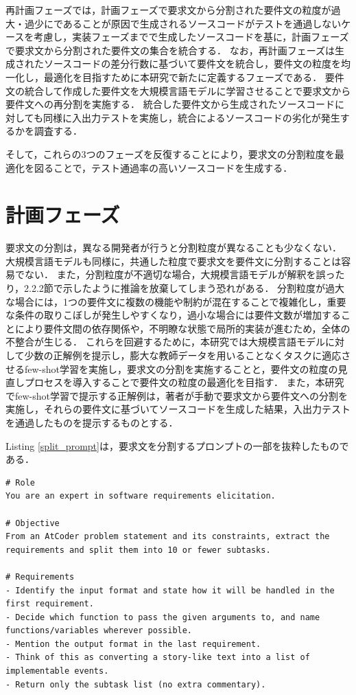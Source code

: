 \documentclass[11pt]{jreport}
\begin{document}
再計画フェーズでは，計画フェーズで要求文から分割された要件文の粒度が過大・過少にであることが原因で生成されるソースコードがテストを通過しないケースを考慮し，実装フェーズまでで生成したソースコードを基に，計画フェーズで要求文から分割された要件文の集合を統合する．
なお，再計画フェーズは生成されたソースコードの差分行数に基づいて要件文を統合し，要件文の粒度を均一化し，最適化を目指すために本研究で新たに定義するフェーズである．
要件文の統合して作成した要件文を大規模言語モデルに学習させることで要求文から要件文への再分割を実施する．
統合した要件文から生成されたソースコードに対しても同様に入出力テストを実施し，統合によるソースコードの劣化が発生するかを調査する．

そして，これらの3つのフェーズを反復することにより，要求文の分割粒度を最適化を図ることで，テスト通過率の高いソースコードを生成する．


\section{計画フェーズ}

要求文の分割は，異なる開発者が行うと分割粒度が異なることも少なくない\cite{Division_Size}．
大規模言語モデルも同様に，共通した粒度で要求文を要件文に分割することは容易でない．
また，分割粒度が不適切な場合，大規模言語モデルが解釈を誤ったり，2.2.2節で示したように推論を放棄してしまう恐れがある．
分割粒度が過大な場合には，1つの要件文に複数の機能や制約が混在することで複雑化し，重要な条件の取りこぼしが発生しやすくなり，過小な場合には要件文数が増加することにより要件文間の依存関係や，不明瞭な状態で局所的実装が進むため，全体の不整合が生じる．
これらを回避するために，本研究では大規模言語モデルに対して少数の正解例を提示し，膨大な教師データを用いることなくタスクに適応させるfew-shot学習を実施し，要求文の分割を実施することと，要件文の粒度の見直しプロセスを導入することで要件文の粒度の最適化を目指す．
また，本研究でfew-shot学習で提示する正解例は，著者が手動で要求文から要件文への分割を実施し，それらの要件文に基づいてソースコードを生成した結果，入出力テストを通過したものを提示するものとする．

Listing \ref{split_prompt}は，要求文を分割するプロンプトの一部を抜粋したものである．


\begin{lstlisting}[caption={要求文分割プロンプト（一部抜粋）},label={split_prompt}]
# Role
You are an expert in software requirements elicitation.

# Objective
From an AtCoder problem statement and its constraints, extract the requirements and split them into 10 or fewer subtasks.

# Requirements
- Identify the input format and state how it will be handled in the first requirement.
- Decide which function to pass the given arguments to, and name functions/variables wherever possible.
- Mention the output format in the last requirement.
- Think of this as converting a story-like text into a list of implementable events.
- Return only the subtask list (no extra commentary).
\end{lstlisting}
\end{document}
